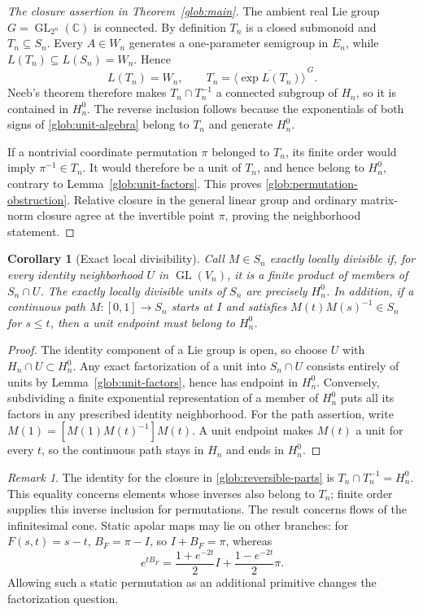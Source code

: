 \documentclass[reqno]{amsart}
\newtheorem{corollary}[theorem]{Corollary}
\theoremstyle{definition}
\theoremstyle{remark}
\newtheorem{remark}[theorem]{Remark}
\newcommand{\C}{\mathbb C}
\begin{document}
\begin{proof}[The closure assertion in Theorem~\ref{glob:main}]
The ambient real Lie group $G=\operatorname{GL}_{2^n}(\C)$ is connected.
By definition $T_n$ is a closed submonoid and $T_n\subseteq S_n$.
Every $A\in W_n$ generates a one-parameter semigroup in $E_n$, while
$L(T_n)\subseteq L(S_n)=W_n$. Hence
\[
 L(T_n)=W_n,\qquad
 T_n=\overline{\langle\exp L(T_n)\rangle}^{\,G}.
\]
Neeb's theorem therefore makes $T_n\cap T_n^{-1}$ a connected
subgroup of $H_n$, so it is contained in $H_n^0$.
The reverse inclusion follows because the exponentials of both signs of
\eqref{glob:unit-algebra} belong to $T_n$ and generate $H_n^0$.

If a nontrivial coordinate permutation $\pi$ belonged to $T_n$, its
finite order would imply $\pi^{-1}\in T_n$.  It would therefore be
a unit of $T_n$, and hence belong to $H_n^0$, contrary to
Lemma~\ref{glob:unit-factors}.  This proves
\eqref{glob:permutation-obstruction}.  Relative closure in the general
linear group and ordinary matrix-norm closure agree at the invertible
point $\pi$, proving the neighborhood statement.
\end{proof}

\begin{corollary}[Exact local divisibility]\label{glob:local-divisibility}
Call $M\in S_n$ exactly locally divisible if, for every identity
neighborhood $U$ in $\operatorname{GL}(V_n)$, it is a finite product
of members of $S_n\cap U$.  The exactly locally divisible units of
$S_n$ are precisely $H_n^0$.  In addition, if a continuous path
$M:[0,1]\to S_n$ starts at $I$ and satisfies
$M(t)M(s)^{-1}\in S_n$ for $s\leq t$, then a unit endpoint must
belong to $H_n^0$.
\end{corollary}

\begin{proof}
The identity component of a Lie group is open, so choose $U$ with
$H_n\cap U\subset H_n^0$.  Any exact factorization of a unit into
$S_n\cap U$ consists entirely of units by
Lemma~\ref{glob:unit-factors}, hence has endpoint in $H_n^0$.
Conversely, subdividing a finite exponential representation of a member
of $H_n^0$ puts all its factors in any prescribed identity neighborhood.
For the path assertion, write
$M(1)=[M(1)M(t)^{-1}]M(t)$.  A unit endpoint makes $M(t)$ a unit
for every $t$, so the continuous path stays in $H_n$ and ends in
$H_n^0$.
\end{proof}

\begin{remark}\label{glob:scope}
The identity for the closure in \eqref{glob:reversible-parts} is
$T_n\cap T_n^{-1}=H_n^0$.  This equality concerns elements whose
inverses also belong to $T_n$; finite order supplies this inverse
inclusion for permutations.
The result concerns flows of the infinitesimal cone.  Static apolar maps
may lie on other branches: for $F(s,t)=s-t$,
$B_F=\pi-I$, so $I+B_F=\pi$, whereas
\[
 e^{tB_F}=\frac{1+e^{-2t}}2I+\frac{1-e^{-2t}}2\pi.
\]
Allowing such a static permutation as an additional primitive changes
the factorization question.
\end{remark}
\end{document}
